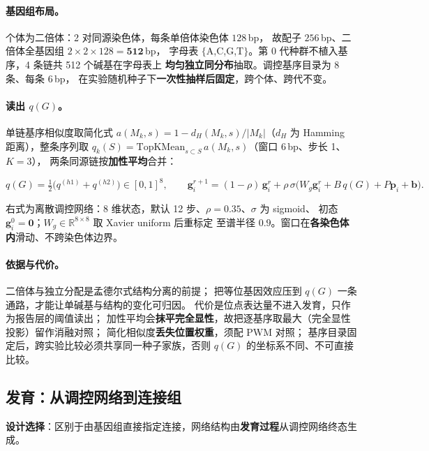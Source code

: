 \paragraph{基因组布局。}个体为二倍体：2 对同源染色体，每条单倍体染色体 $128$\,bp，
故配子 $256$\,bp、二倍体全基因组 $2\times2\times128=\mathbf{512}$\,bp，
字母表 $\{$A,C,G,T$\}$。第 0 代种群不植入基序，4 条链共 512 个碱基在字母表上
\textbf{均匀独立同分布}抽取。调控基序目录为 8 条、每条 $6$\,bp，
在实验随机种子下\textbf{一次性抽样后固定}，跨个体、跨代不变。

\paragraph{读出 $q(G)$。}单链基序相似度取简化式
$a(M_k,s)=1-d_H(M_k,s)/|M_k|$（$d_H$ 为 Hamming 距离），整条序列取
$q_k(S)=\mathrm{TopKMean}_{s\subset S}\,a(M_k,s)$（窗口 $6$\,bp、步长 1、$K=3$），
两条同源链按\textbf{加性平均}合并：

\begin{equation}\label{method:eq-qg}
q(G)=\tfrac12\bigl(q^{(h1)}+q^{(h2)}\bigr)\in[0,1]^8 ,
\qquad
\mathbf g_i^{r+1}=(1-\rho)\,\mathbf g_i^{r}
+\rho\,\sigma\!\bigl(W_g\mathbf g_i^{r}+B\,q(G)+P\mathbf p_i+\mathbf b\bigr).
\end{equation}

右式为离散调控网络：8 维状态，默认 12 步、$\rho=0.35$、$\sigma$ 为 sigmoid、
初态 $\mathbf g_i^{0}=\mathbf 0$；$W_g\in\mathbb R^{8\times8}$ 取 Xavier uniform 后重标定
至谱半径 $0.9$。窗口在\textbf{各染色体内}滑动、不跨染色体边界。

\paragraph{依据与代价。}二倍体与独立分配是孟德尔式结构分离的前提；
把等位基因效应压到 $q(G)$ 一条通路，才能让单碱基与结构的变化可归因。
代价是位点表达量不进入发育，只作为报告层的阈值读出；
加性平均会\textbf{抹平完全显性}，故把逐基序取最大（完全显性投影）留作消融对照；
简化相似度\textbf{丢失位置权重}，须配 PWM 对照；
基序目录固定后，跨实验比较必须共享同一种子家族，否则 $q(G)$ 的坐标系不同、不可直接比较。

\subsection{发育：从调控网络到连接组}\label{method:dev}

\textbf{设计选择}：区别于由基因组直接指定连接，网络结构由\textbf{发育过程}从调控网络终态生成。

